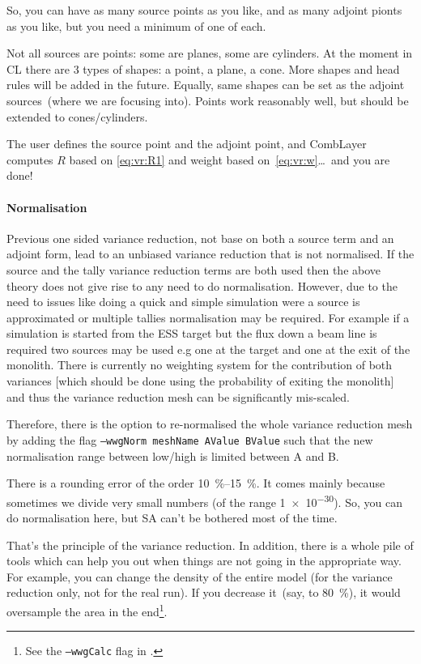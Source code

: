 So, you can have as many source points as you like,
and as many adjoint pionts as you like, but you need a minimum of one of each.

Not all sources are points: some are planes, some are cylinders. At
the moment in CL there are 3 types of shapes: a point, a plane, a
cone.  More shapes and head rules will be added in the future.
Equally, same shapes can be set as the adjoint sources~(where we are
focusing into).  Points work reasonably well, but should be extended
to cones/cylinders.

The user defines the source point and the adjoint point, and CombLayer computes $R$ based on \eqref{eq:vr:R1} and
weight based on~\eqref{eq:vr:w}\dots\ and you are done!

\paragraph{Normalisation}

Previous one sided variance reduction, not base on both a source term
and an adjoint form, lead to an unbiased variance reduction that is
not normalised. If the source and the tally variance reduction terms
are both used then the above theory does not give rise to any need to
do normalisation. However, due to the need to issues like doing a
quick and simple simulation were a source is approximated or multiple
tallies normalisation may be required. For example if a simulation is
started from the ESS target but the flux down a beam line is required
two sources may be used e.g one at the target and one at the exit of
the monolith. There is currently no weighting system for the
contribution of both variances [which should be done using the
  probability of exiting the monolith] and thus the variance reduction
mesh can be significantly mis-scaled.

Therefore, there is the option to re-normalised the whole variance
reduction mesh by adding the flag {\tt --wwgNorm meshName AValue BValue} such
that the new normalisation range between low/high is limited between A
and B.


There is a rounding error of the order \SIrange{10}{15}{\percent}.
It comes mainly because sometimes we divide very small numbers (of the range \num[retain-unity-mantissa=false]{1e-30}). So, you can do normalisation here, but
SA can't be bothered most of the time.

\bigskip

That's the principle of the variance reduction. In addition, there is a whole pile of tools which can help you out when things
are not going in the appropriate way.
For example, you can change the density of the entire model (for the variance reduction only, not for the real run).
If you decrease it~(say, to \SI{80}{\percent}), it would oversample the area in the end\footnote{See the {\tt --wwgCalc} flag in .}.

